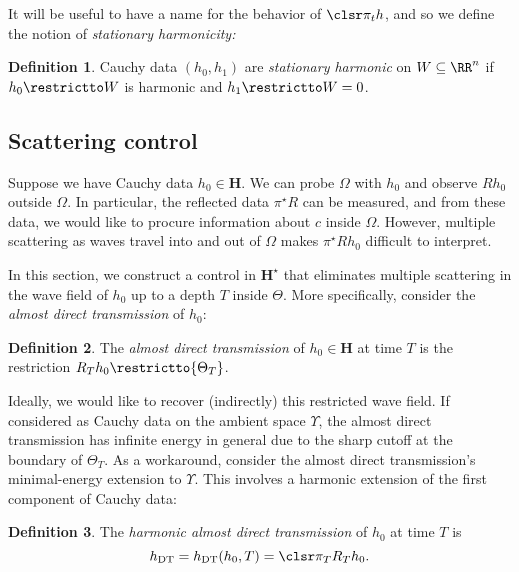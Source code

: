 \documentclass[10pt]{article}
\theoremstyle{plain}
\theoremstyle{definition}
\newtheorem*{defn}{Definition}
\theoremstyle{remark}
\numberwithin{theorem}{section}
\numberwithin{example}{section}
\numberwithin{equation}{section}
\numberwithin{figure}{section}
\newcommand\DT{\ensuremath{_{\text{\normalfont DT}}}}		%
\begin{document}
It will be useful to have a name for the behavior of $\clsr\pi_t h$, and so we define the notion of \emph{stationary harmonicity:}

\begin{defn}
Cauchy data $(h_0,h_1)$ are \emph{stationary harmonic} on $W\subseteq\RR^n$ if $h_0\restrictto W$ is harmonic and $h_1\restrictto W=0$.
\end{defn}






\subsection{Scattering control}				\label{s:exact-maf}


Suppose we have Cauchy data $h_0\in\mathbf H$. We can probe $\Omega$ with $h_0$ and observe $Rh_0$ outside $\Omega$. In particular, the reflected data $\pi^\star R$ can be measured, and from these data, we would like to procure information about $c$ inside $\Omega$. However, multiple scattering as waves travel into and out of $\Omega$ makes $\pi^\star Rh_0$ difficult to interpret. 

In this section, we construct a control in $\mathbf H^\star$ that eliminates multiple scattering in the wave field of $h_0$ up to a depth $T$ inside $\Theta$. More specifically, consider the \emph{almost direct transmission} of $h_0$:

\begin{defn}
	The \emph{almost direct transmission} of $h_0\in\mathbf H$ at time $T$ is the restriction $R_Th_0\restrictto{\Theta_{T}}$.
\end{defn}

Ideally, we would like to recover (indirectly) this restricted wave field. If considered as Cauchy data on the ambient space $\Upsilon$, the almost direct transmission has infinite energy in general due to the sharp cutoff at the boundary of $\Theta_T$. As a workaround, consider the almost direct transmission's minimal-energy extension to $\Upsilon$. This involves a harmonic extension of the first component of Cauchy data:

\begin{defn}
	The \emph{harmonic almost direct transmission} of $h_0$ at time $T$ is
	\begin{equation}
		h\DT = h\DT(h_0,T)=\clsr\pi_T R_T h_0.
		\label{e:adt-def}
	\end{equation}
\end{defn}
\end{document}
